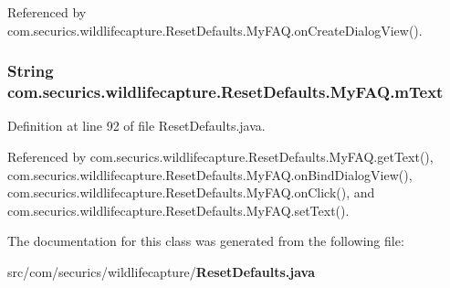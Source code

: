 Referenced by com.\+securics.\+wildlifecapture.\+Reset\+Defaults.\+My\+F\+A\+Q.\+on\+Create\+Dialog\+View().

\subsubsection[{m\+Text}]{\setlength{\rightskip}{0pt plus 5cm}String com.\+securics.\+wildlifecapture.\+Reset\+Defaults.\+My\+F\+A\+Q.\+m\+Text\hspace{0.3cm}{\ttfamily [private]}}\label{classcom_1_1securics_1_1wildlifecapture_1_1_reset_defaults_1_1_my_f_a_q_a240493c3b41a7b71bbed4fdd4e25a89a}


Definition at line 92 of file Reset\+Defaults.\+java.



Referenced by com.\+securics.\+wildlifecapture.\+Reset\+Defaults.\+My\+F\+A\+Q.\+get\+Text(), com.\+securics.\+wildlifecapture.\+Reset\+Defaults.\+My\+F\+A\+Q.\+on\+Bind\+Dialog\+View(), com.\+securics.\+wildlifecapture.\+Reset\+Defaults.\+My\+F\+A\+Q.\+on\+Click(), and com.\+securics.\+wildlifecapture.\+Reset\+Defaults.\+My\+F\+A\+Q.\+set\+Text().



The documentation for this class was generated from the following file\+:\begin{DoxyCompactItemize}
\item 
src/com/securics/wildlifecapture/{\bf Reset\+Defaults.\+java}\end{DoxyCompactItemize}
